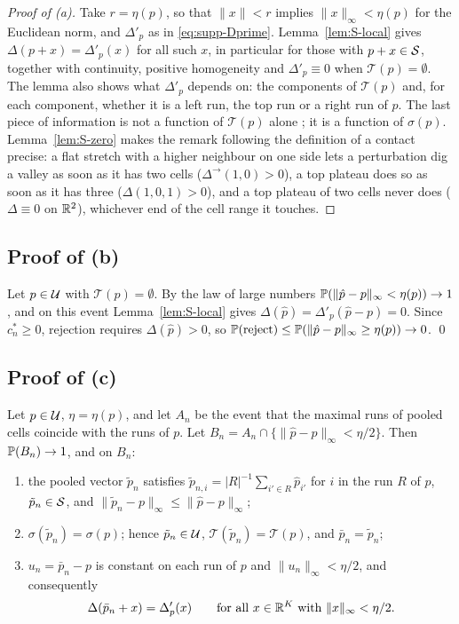 \begin{proof}[Proof of (a)]
Take $r=\eta(p)$, so that $\|x\|<r$ implies $\|x\|_\infty<\eta(p)$ for the Euclidean norm, and $\Delta'_p$ as in \eqref{eq:supp-Dprime}. Lemma~\ref{lem:S-local} gives $\Delta(p+x)=\Delta'_p(x)$ for all such $x$, in particular for those with $p+x\in\mathcal{S}$, together with continuity, positive homogeneity and $\Delta'_p\equiv0$ when $\mathcal T(p)=\emptyset$. The lemma also shows what $\Delta'_p$ depends on: the components of $\mathcal T(p)$ and, for each component, whether it is a left run, the top run or a right run of $p$. The last piece of information is not a function of $\mathcal T(p)$ alone ; it is a function of $\sigma(p)$. Lemma~\ref{lem:S-zero} makes the remark following the definition of a contact precise: a flat stretch with a higher neighbour on one side lets a perturbation dig a valley as soon as it has two cells ($\Delta^{\to}(1,0)>0$), a top plateau does so as soon as it has three ($\Delta(1,0,1)>0$), and a top plateau of two cells never does ($\Delta\equiv0$ on $\mathbb{R}^2$), whichever end of the cell range it touches.
\end{proof}

\subsection{Proof of (b)}

Let $p\in\mathcal{U}$ with $\mathcal T(p)=\emptyset$. By the law of large numbers $\mathbb{P}(\|\hat p-p\|_\infty<\eta(p))\to1$, and on this event Lemma~\ref{lem:S-local} gives $\Delta(\hat p)=\Delta'_p(\hat p-p)=0$. Since $c^\ast_n\ge0$, rejection requires $\Delta(\hat p)>0$, so $\mathbb{P}(\text{reject})\le\mathbb{P}(\|\hat p-p\|_\infty\ge\eta(p))\to0$. \qed

\subsection{Proof of (c)}

\begin{lemma}\label{lem:S-ties}
Let $p\in\mathcal{U}$, $\eta=\eta(p)$, and let $A_n$ be the event that the maximal runs of pooled cells coincide with the runs of $p$. Let $B_n=A_n\cap\{\|\hat p-p\|_\infty<\eta/2\}$. Then $\mathbb{P}(B_n)\to1$, and on $B_n$:
\begin{enumerate}
\item[(i)] the pooled vector $\tilde p_n$ satisfies $\tilde p_{n,i}=|R|^{-1}\sum_{i'\in R}\hat p_{i'}$ for $i$ in the run $R$ of $p$, $\tilde p_n\in\mathcal{S}$, and $\|\tilde p_n-p\|_\infty\le\|\hat p-p\|_\infty$;
\item[(ii)] $\sigma(\tilde p_n)=\sigma(p)$; hence $\tilde p_n\in\mathcal{U}$, $\mathcal T(\tilde p_n)=\mathcal T(p)$, and $\bar p_n=\tilde p_n$;
\item[(iii)] $u_n=\bar p_n-p$ is constant on each run of $p$ and $\|u_n\|_\infty<\eta/2$, and consequently
\[
\Delta(\bar p_n+x)=\Delta'_p(x)\qquad\text{for all $x\in\mathbb{R}^K$ with }\|x\|_\infty<\eta/2 .
\]
\end{enumerate}
\end{lemma}

